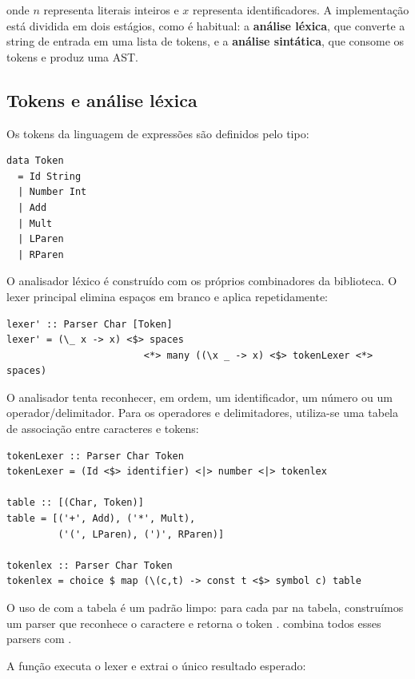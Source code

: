 onde \(n\) representa literais inteiros e \(x\) representa
identificadores. A implementação está dividida em dois estágios, como
é habitual: a \textbf{análise léxica}, que converte a string de
entrada em uma lista de tokens, e a \textbf{análise sintática}, que
consome os tokens e produz uma AST.

\subsection{Tokens e análise léxica}

Os tokens da linguagem de expressões são definidos pelo tipo:

\begin{verbatim}
data Token
  = Id String
  | Number Int
  | Add
  | Mult
  | LParen
  | RParen
\end{verbatim}

O analisador léxico é construído com os próprios combinadores da
biblioteca. O lexer principal elimina espaços em branco e aplica
 repetidamente:

\begin{verbatim}
lexer' :: Parser Char [Token]
lexer' = (\_ x -> x) <$> spaces
                        <*> many ((\x _ -> x) <$> tokenLexer <*> spaces)
\end{verbatim}

O analisador  tenta reconhecer,
em ordem, um identificador, um número ou um operador/delimitador.
Para os operadores e delimitadores, utiliza-se uma tabela de
associação entre caracteres e tokens:

\begin{verbatim}
tokenLexer :: Parser Char Token
tokenLexer = (Id <$> identifier) <|> number <|> tokenlex

table :: [(Char, Token)]
table = [('+', Add), ('*', Mult),
         ('(', LParen), (')', RParen)]

tokenlex :: Parser Char Token
tokenlex = choice $ map (\(c,t) -> const t <$> symbol c) table
\end{verbatim}

O uso de  com a tabela é um padrão
limpo: para cada par  na tabela,
construímos um parser que reconhece o caractere
 e retorna o token
.  combina
todos esses parsers com \haskell{<|>}.

A função  executa o lexer e extrai
o único resultado esperado:

